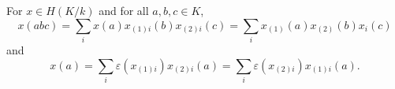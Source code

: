 For $x \in H(K/k)$ and for all $a, b, c \in K$,
$$x(abc) = \sum_i x(a) x_{(1)i}(b) x_{(2)i}(c) = \sum_i x_{(1)}(a) x_{(2)}(b) x_i(c)$$
and
$$x(a) = \sum_i \varepsilon(x_{(1)i}) x_{(2)i}(a) = \sum_i \varepsilon(x_{(2)i}) x_{(1)i}(a).$$
